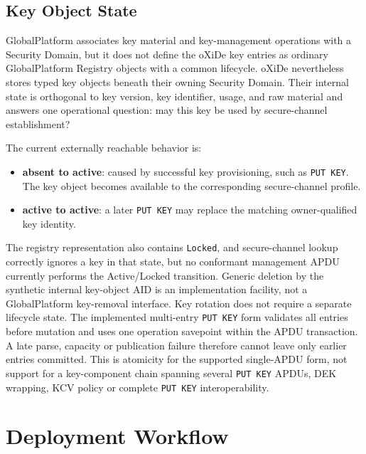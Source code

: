 \subsection{Key Object State}
\label{sec:gp-lifecycle-key}

GlobalPlatform associates key material and key-management operations with a
Security Domain, but it does not define the oXiDe key entries as ordinary
GlobalPlatform Registry objects with a common lifecycle. oXiDe nevertheless
stores typed key objects beneath their owning Security Domain. Their internal
state is orthogonal to key version, key identifier, usage, and raw material and
answers one operational question: may this key be used by secure-channel
establishment?

The current externally reachable behavior is:

\begin{itemize}
\item \textbf{absent to active}: caused by successful key provisioning, such
  as \texttt{PUT KEY}. The key object becomes available to the corresponding
  secure-channel profile.
\item \textbf{active to active}: a later \texttt{PUT KEY} may replace the
  matching owner-qualified key identity.
\end{itemize}

The registry representation also contains \texttt{Locked}, and secure-channel
lookup correctly ignores a key in that state, but no conformant management APDU
currently performs the Active/Locked transition. Generic deletion by the
synthetic internal key-object AID is an implementation facility, not a
GlobalPlatform key-removal interface. Key rotation does not require a separate
lifecycle state. The implemented multi-entry \texttt{PUT KEY} form validates
all entries before mutation and uses one operation savepoint within the APDU
transaction. A late parse, capacity or publication failure therefore cannot
leave only earlier entries committed. This is atomicity for the supported
single-APDU form, not support for a key-component chain spanning several
\texttt{PUT KEY} APDUs, DEK wrapping, KCV policy or complete
\texttt{PUT KEY} interoperability.

\section{Deployment Workflow}
\label{sec:gp-deployment-workflow}


